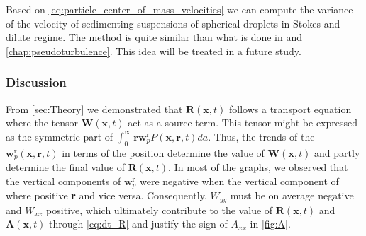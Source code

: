 Based on \ref{eq:particle_center_of_mass_velocities} we can compute the variance of the velocity of sedimenting suspensions of spherical droplets in Stokes and dilute regime.
The method is quite similar than what is done in \citet{zhang2021ensemble} and \ref{chap:pseudoturbulence}. 
This idea will be treated in a future study. 

\subsubsection{Discussion}

    

From \ref{sec:Theory} we demonstrated that $\textbf{R}(\textbf{x},t)$ follows a transport equation where the tensor $\textbf{W}(\textbf{x},t)$ act as a source term. 
This tensor might be expressed as the symmetric part of $\int_0^\infty \textbf{r} \textbf{w}_p^\text{r} P(\textbf{x},\textbf{r},t) da$. 
Thus, the trends of the $\textbf{w}_p^\text{r}(\textbf{x},\textbf{r},t) $ in terms of the position determine the value of $\textbf{W}(\textbf{x},t)$ and partly determine the final value of $\textbf{R}(\textbf{x},t)$. 
In most of the graphs, we observed that the vertical components of $\textbf{w}_p^\text{r}$ were negative when the vertical component of where positive \textbf{r} and vice versa. 
Consequently, $W_{yy}$ must be on average negative and $W_{xx}$ positive, which ultimately contribute to the value of $\textbf{R}(\textbf{x},t)$ and $\textbf{A}(\textbf{x},t)$ through \ref{eq:dt_R} and justify the sign of $A_{xx}$ in \ref{fig:A}. 

